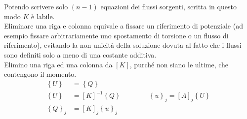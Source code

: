 Potendo scrivere solo $(n-1) $ equazioni dei flussi sorgenti, scritta in questo modo $K$ è labile. \\
Eliminare una riga e colonna equivale a fissare un riferimento di potenziale (ad esempio fissare arbitrariamente uno spostamento di torsione o un flusso di riferimento), evitando la non unicità della soluzione dovuta al fatto che i flussi sono definiti solo a meno di una costante additiva.\\
Elimino una riga ed una colonna da $[K]$, purché non siano le ultime, che contengono il momento.
\begin{align*}
    [K]\left\{U\right\}&= \left\{Q\right\}\\
    \left\{U\right\}&= [K]^{-1}\left\{Q\right\} \qquad\qquad
     \left\{u\right\}_j= [A]_j\left\{U\right\}\\
      \left\{Q\right\}_j&= [K]_j\left\{u\right\}_j\\
\end{align*}



   